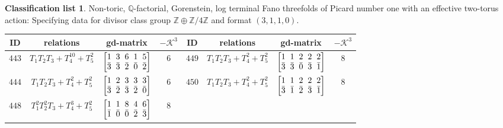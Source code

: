 \documentclass[10pt,a4paper]{amsart}
\theoremstyle{definition}
\newtheorem{class-list}[thm]{Classification list}
\def\ZZ{{\mathbb Z}}
\def\QQ{{\mathbb Q}}
\numberwithin{equation}{section}
\begin{document}
\begin{class-list}
Non-toric, $\QQ$-factorial, Gorenstein, log terminal Fano
threefolds of Picard number one with an effective two-torus action:
Specifying data for divisor class group $\ZZ\oplus \ZZ/4\ZZ$ and
format $(3,1,1,0)$.
\begin{table}[h!]\centering\setlength{\tabcolsep}{3.5pt}
\renewcommand{\arraystretch}{1.15}\small\tabulinesep=1mm
\begin{tabu}{c|c|c|c||c|c|c|c}
\hline
ID&relations&gd-matrix&$-\mathcal{K}^3$&ID&relations&gd-matrix&$-\mathcal{K}^3$
\\
\hline
${443}$&${T_{1}T_{2}T_{3}+T_{4}^{10}+T_{5}^{2}}$
&$\arraycolsep=1mm\begin{bmatrix}{1} & {3} & {6} & {1} & {5} \\ {\bar{3}} & {\bar{3}} & {\bar{2}} & {\bar{0}} & {\bar{2}}\end{bmatrix}$&${6}$
&${449}$&${T_{1}T_{2}T_{3}+T_{4}^{2}+T_{5}^{2}}$
&$\arraycolsep=1mm\begin{bmatrix}{1} & {1} & {2} & {2} & {2} \\ {\bar{3}} & {\bar{3}} & {\bar{0}} & {\bar{3}} & {\bar{1}}\end{bmatrix}$&${8}$
\\
\hline
${444}$&${T_{1}T_{2}T_{3}+T_{4}^{2}+T_{5}^{2}}$
&$\arraycolsep=1mm\begin{bmatrix}{1} & {2} & {3} & {3} & {3} \\ {\bar{3}} & {\bar{2}} & {\bar{3}} & {\bar{2}} & {\bar{0}}\end{bmatrix}$&${6}$
&${450}$&${T_{1}T_{2}T_{3}+T_{4}^{2}+T_{5}^{2}}$
&$\arraycolsep=1mm\begin{bmatrix}{1} & {1} & {2} & {2} & {2} \\ {\bar{3}} & {\bar{1}} & {\bar{2}} & {\bar{3}} & {\bar{1}}\end{bmatrix}$&${8}$
\\
\hline
${448}$&${T_{1}^{2}T_{2}^{2}T_{3}+T_{4}^{3}+T_{5}^{2}}$
&$\arraycolsep=1mm\begin{bmatrix}{1} & {1} & {8} & {4} & {6} \\ {\bar{1}} & {\bar{0}} & {\bar{0}} & {\bar{2}} & {\bar{3}}\end{bmatrix}$&${8}$
\\
\end{tabu}%
\end{table}
\end{class-list}
\end{document}
